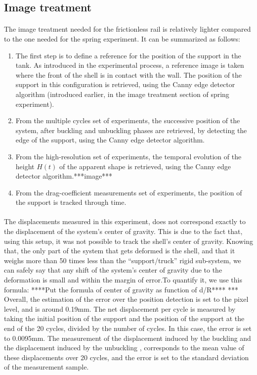 \subsection{Image treatment}
\paragraph{}
The image treatment needed for the frictionless rail is relatively lighter compared to the one needed for the spring experiment. It can be summarized as follows:
\begin{enumerate}
	\item The first step is to define a reference for the position of the support in the tank. As introduced in the experimental process, a reference image is taken where the front of the shell is in contact with the wall. The position of the support in this configuration is retrieved, using the Canny edge detector algorithm (introduced earlier, in the image treatment section of spring experiment).
	
	\item From the multiple cycles set of experiments, the successive position of the system, after buckling and unbuckling phases are retrieved, by detecting the edge of the support, using the Canny edge detector algorithm.
	
	\item From the high-resolution set of experiments, the temporal evolution of the height $H(t)$ of the apparent shape is retrieved, using the Canny edge detector algorithm.***image***
	\item From the drag-coefficient measurements set of experiments, the position of the support is tracked through time.
\end{enumerate}
\paragraph{}
The displacements measured in this experiment, does not correspond exactly to the displacement of the system's center of gravity. This is due to the fact that, using this setup, it was not possible to track the shell's center of gravity. Knowing that, the only part of the system that gets deformed is the shell, and that it weighs more than 50 times less than the "`support/truck"' rigid sub-system, we can safely say that any shift of the system's center of gravity due to the deformation is small and within the margin of error.To quantify it, we use this formula:
 ****Put the formula of center of gravity as function of d/R****
***   
Overall, the estimation of the error over the position detection is set to the pixel level, and is around 0.19mm. The net displacement per cycle is measured by taking the initial position of the support and the position of the support at the end of the 20 cycles, divided by the number of cycles. In this case, the error is set to 0.0095mm. The measurement of the displacement induced by the buckling and the displacement induced by the unbuckling , corresponds to the mean value of these displacements over 20 cycles, and the error is set to the standard deviation of the measurement sample.

